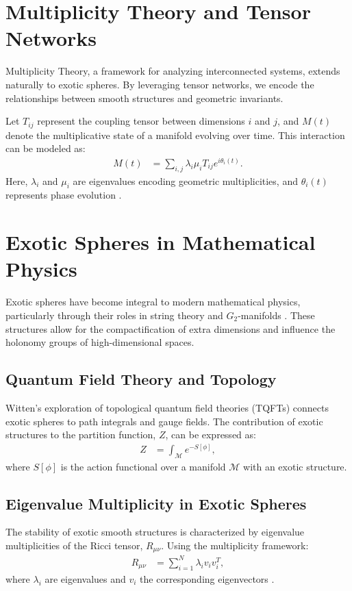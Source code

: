 \documentclass{article}
\theoremstyle{plain}
\begin{document}
\section{Multiplicity Theory and Tensor Networks}
Multiplicity Theory, a framework for analyzing interconnected systems, extends naturally to exotic spheres. By leveraging tensor networks, we encode the relationships between smooth structures and geometric invariants.

Let $T_{ij}$ represent the coupling tensor between dimensions $i$ and $j$, and $M(t)$ denote the multiplicative state of a manifold evolving over time. This interaction can be modeled as:
\begin{equation}
\begin{aligned}
M(t) &= \sum_{i,j} \lambda_i \mu_i T_{ij} e^{i\theta_i(t)}.
\end{aligned}
\end{equation}
Here, $\lambda_i$ and $\mu_i$ are eigenvalues encoding geometric multiplicities, and $\theta_i(t)$ represents phase evolution \cite{Atiyah1968}.

\section{Exotic Spheres in Mathematical Physics}
Exotic spheres have become integral to modern mathematical physics, particularly through their roles in string theory and $G_2$-manifolds \cite{Joyce1996}. These structures allow for the compactification of extra dimensions and influence the holonomy groups of high-dimensional spaces.

\subsection{Quantum Field Theory and Topology}
Witten's exploration of topological quantum field theories (TQFTs) \cite{Witten1988} connects exotic spheres to path integrals and gauge fields. The contribution of exotic structures to the partition function, $Z$, can be expressed as:
\begin{equation}
\begin{aligned}
Z &= \int_{\mathcal{M}} e^{-S[\phi]},
\end{aligned}
\end{equation}
where $S[\phi]$ is the action functional over a manifold $\mathcal{M}$ with an exotic structure.

\subsection{Eigenvalue Multiplicity in Exotic Spheres}
The stability of exotic smooth structures is characterized by eigenvalue multiplicities of the Ricci tensor, $R_{\mu\nu}$. Using the multiplicity framework:
\begin{equation}
\begin{aligned}
R_{\mu\nu} &= \sum_{i=1}^N \lambda_i v_i v_i^T,
\end{aligned}
\end{equation}
where $\lambda_i$ are eigenvalues and $v_i$ the corresponding eigenvectors \cite{Donaldson1983}.
\end{document}
